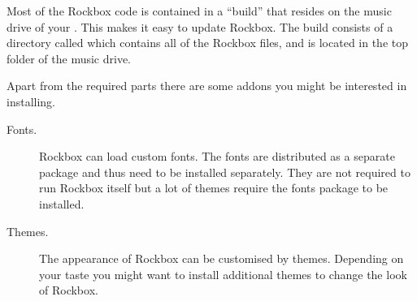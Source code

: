 \begin{description}
{\item[The Rockbox firmware.]
  Most of the Rockbox code is contained in a ``build'' that resides on the
  music drive of your \dap{}. This makes it easy to update Rockbox. The build
  consists of a directory called  which contains all of the
  Rockbox files, and is located in the top folder of the music drive.
}

\end{description}

Apart from the required parts there are some addons you might be interested
in installing.
\begin{description}
\item[Fonts.] Rockbox can load custom fonts. The fonts are
    distributed as a separate package and thus need to be installed
    separately. They are not required to run Rockbox itself but
    a lot of themes require the fonts package to be installed.

\item[Themes.] The appearance of Rockbox can be customised by themes. Depending
    on your taste you might want to install additional themes to change
    the look of Rockbox.
\end{description}

